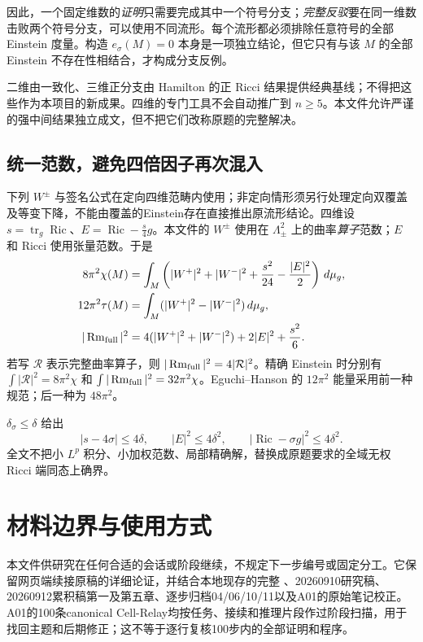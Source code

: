 \documentclass[UTF8,a4paper,11pt,fontset=fandol]{ctexart}
\numberwithin{equation}{section}
\theoremstyle{definition}
\newcommand{\Ric}{\operatorname{Ric}}
\newcommand{\Rm}{\operatorname{Rm}}
\newcommand{\tr}{\operatorname{tr}}
\newcommand{\dd}{\,d\mu_g}
\begin{document}
因此，一个固定维数的\emph{证明}只需要完成其中一个符号分支；\emph{完整反驳}要在同一维数击败两个符号分支，可以使用不同流形。每个流形都必须排除任意符号的全部 Einstein 度量。构造 $e_\sigma(M)=0$ 本身是一项独立结论，但它只有与该 $M$ 的全部 Einstein 不存在性相结合，才构成分支反例。

二维由一致化、三维正分支由 Hamilton 的正 Ricci 结果提供经典基线；不得把这些作为本项目的新成果。四维的专门工具不会自动推广到 $n\ge5$。本文件允许严谨的强中间结果独立成文，但不把它们改称原题的完整解决。

\subsection{统一范数，避免四倍因子再次混入}
下列 $W^\pm$ 与签名公式在定向四维范畴内使用；非定向情形须另行处理定向双覆盖及等变下降，不能由覆盖的Einstein存在直接推出原流形结论。四维设 $s=\tr_g\Ric$、$E=\Ric-\frac{s}{4}g$。本文件的 $W^\pm$ 使用在 $\Lambda^2_\pm$ 上的曲率\emph{算子}范数；$E$ 和 Ricci 使用张量范数。于是
\begin{align}
8\pi^2\chi(M)&=\int_M\left(|W^+|^2+|W^-|^2+\frac{s^2}{24}-\frac{|E|^2}{2}\right)\dd,\label{eq:CGB}\\
12\pi^2\tau(M)&=\int_M(|W^+|^2-|W^-|^2)\dd,\label{eq:signature}\\
|\Rm_{\rm full}|^2&=4(|W^+|^2+|W^-|^2)+2|E|^2+\frac{s^2}{6}.
\end{align}
若写 $\mathcal R$ 表示完整曲率算子，则 $|\Rm_{\rm full}|^2=4|\mathcal R|^2$。精确 Einstein 时分别有 $\int|\mathcal R|^2=8\pi^2\chi$ 和 $\int|\Rm_{\rm full}|^2=32\pi^2\chi$。Eguchi--Hanson 的 $12\pi^2$ 能量采用前一种规范；后一种为 $48\pi^2$。

$\delta_\sigma\le\delta$ 给出
\begin{equation}
 |s-4\sigma|\le4\delta,\qquad |E|^2\le4\delta^2,\qquad
 |\Ric-\sigma g|^2\le4\delta^2.
\end{equation}
全文不把小 $L^p$ 积分、小加权范数、局部精确解，替换成原题要求的全域无权 Ricci 端同态上确界。

\section{材料边界与使用方式}
本文件供研究在任何合适的会话或阶段继续，不规定下一步编号或固定分工。它保留网页端续接原稿的详细论证，并结合本地现存的完整 、20260910研究稿、20260912累积稿第一及第五章、逐步归档04/06/10/11以及A01的原始笔记校正。A01的100条canonical Cell-Relay均按任务、接续和推理片段作过阶段扫描，用于找回主题和后期修正；这不等于逐行复核100步内的全部证明和程序。
\end{document}
